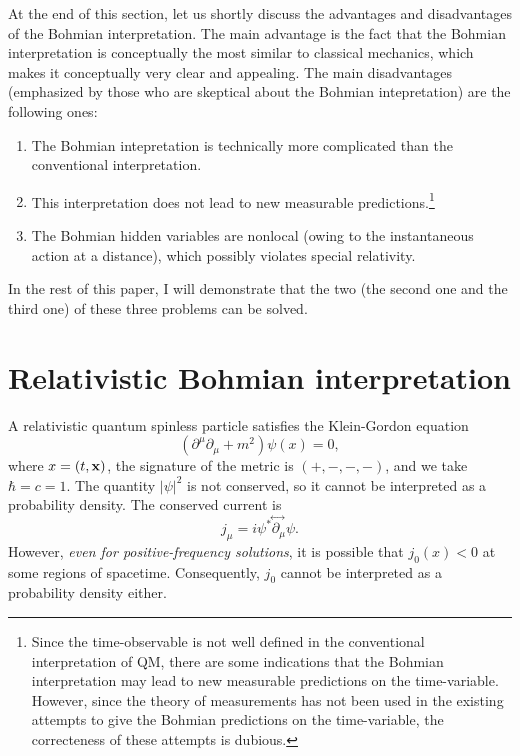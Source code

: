 \documentclass[12pt]{article} %
\begin{document}
At the end of this section, let us shortly discuss the
advantages and disadvantages of the Bohmian interpretation.
The main advantage is the fact that the Bohmian interpretation 
is conceptually the 
most similar to classical mechanics, which makes it conceptually 
very clear and appealing. 
The main disadvantages (emphasized by those who are skeptical 
about the Bohmian intepretation) are the following ones:
\begin{enumerate}
\item The Bohmian intepretation is 
technically more complicated than the conventional interpretation. 
\item This interpretation does not lead to new measurable 
predictions.\footnote{Since the time-observable 
is not well defined in the conventional 
interpretation of QM, there are some indications 
that the Bohmian interpretation may lead to new measurable
predictions on the time-variable. However, since the theory 
of measurements has not been used in the existing attempts to give the 
Bohmian predictions on the time-variable, 
the correcteness of these attempts is dubious.} 
\item The Bohmian hidden variables are nonlocal 
(owing to the instantaneous action at a distance), 
which possibly violates special relativity.
\end{enumerate}  
In the rest of this paper, I will demonstrate that the two 
(the second one and the third one) 
of these three problems can be solved.
  
\section{Relativistic Bohmian interpretation}

A relativistic quantum spinless particle satisfies
the Klein-Gordon equation 
\begin{equation}
(\partial^{\mu}\partial_{\mu}+m^2)\psi(x)=0 ,
\end{equation}
where $x=(t,\bf{x})$, the signature of the metric 
is $(+,-,-,-)$, and we take $\hbar=c=1$.
The quantity $|\psi|^2$ is not conserved, so it cannot be 
interpreted as a probability density. 
The conserved current is 
\begin{equation}
j_{\mu}=i\psi^* \!\stackrel{\leftrightarrow\;}{\partial_{\mu}}\! \psi .
\end{equation}
However, {\em even for positive-frequency solutions}, it is possible that 
$j_0(x)<0$ at some regions of spacetime. 
Consequently, $j_0$ cannot be interpreted as a probability density either. 
\end{document}
